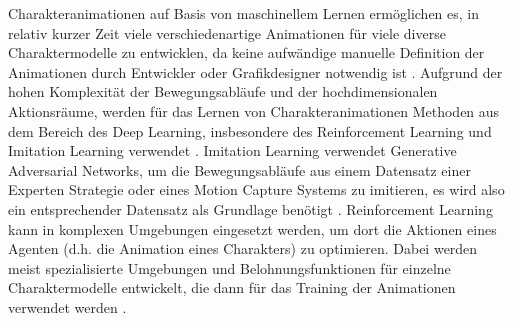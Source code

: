 Charakteranimationen auf Basis von maschinellem Lernen ermöglichen es, in relativ kurzer Zeit viele verschiedenartige Animationen für viele diverse Charaktermodelle zu entwicklen, da keine aufwändige manuelle Definition der Animationen durch Entwickler oder Grafikdesigner notwendig ist \cite{reinforcement_animation}. Aufgrund der hohen Komplexität der Bewegungsabläufe und der hochdimensionalen Aktionsräume, werden für das Lernen von Charakteranimationen Methoden aus dem Bereich des Deep Learning, insbesondere des Reinforcement Learning und Imitation Learning verwendet \cite{reusable_skills, deep_learning_animation}. Imitation Learning verwendet Generative Adversarial Networks, um die Bewegungsabläufe aus einem Datensatz einer Experten Strategie oder eines Motion Capture Systems zu imitieren, es wird also ein entsprechender Datensatz als Grundlage benötigt \cite{gail,reusable_skills}. Reinforcement Learning kann in komplexen Umgebungen eingesetzt werden, um dort die Aktionen eines Agenten (d.h. die Animation eines Charakters) zu optimieren. Dabei werden meist spezialisierte Umgebungen und Belohnungsfunktionen für einzelne Charaktermodelle entwickelt, die dann für das Training der Animationen verwendet werden \cite{deep_learning_animation}. 

